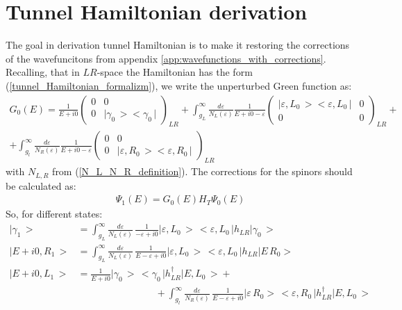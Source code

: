 \chapter{Tunnel Hamiltonian derivation} 
\label{app:tunnel}
The goal in derivation tunnel Hamiltonian is to make it restoring the corrections of the wavefuncitons from appendix \ref{app:wavefunctions_with_corrections}.
Recalling, that in $ LR $-space the Hamiltonian has the form (\ref{tunnel_Hamiltonian_formalizm}), we write the unperturbed Green function as:
\begin{multline}
G_{0}\left(E\right)=\frac{1}{E+i0}\begin{pmatrix}0 & 0\\
0 & \big|\gamma_{0}\,\big>\big<\gamma_{0}\,\big|
\end{pmatrix}_{LR}+\int_{g_{L}}^{\infty}\frac{d\varepsilon}{N_{L}\left(\varepsilon\right)}\frac{1}{E+i0-\varepsilon}\begin{pmatrix}\big|\varepsilon,L_{0}\,\big>\big<\varepsilon,L_{0}\,\big| & 0\\
0 & 0
\end{pmatrix}_{LR}+\\+\int_{g_{l}}^{\infty}\frac{d\varepsilon}{N_{R}\left(\varepsilon\right)}\frac{1}{E+i0-\varepsilon}\begin{pmatrix}0 & 0\\
0 & \big|\varepsilon,R_{0}\,\big>\big<\varepsilon,R_{0}\,\big|
\end{pmatrix}_{LR}
\end{multline}
with $ N_{L,R} $ from (\ref{N_L_N_R_definition}). 
The corrections for the spinors should be calculated as:
\begin{gather}
\Psi_{1}\left(E\right)=G_{0}\left(E\right)H_{T}\Psi_{0}\left(E\right)
\end{gather}
So, for different states:
\begin{align}
\big|\gamma_{1}\,\big>&=\int_{g_{L}}^{\infty}\frac{d\varepsilon}{N_{L}\left(\varepsilon\right)}\,\frac{1}{-\varepsilon+i0}\big|\varepsilon,L_{0}\,\big>\,\big<\varepsilon,L_{0}\,\big|h_{LR}\big|\gamma_{0}\,\big>
\\
\big|E+i0,R_{1}\,\big>&=\int_{g_{L}}^{\infty}\frac{d\varepsilon}{N_{L}\left(\varepsilon\right)}\,\frac{1}{E-\varepsilon+i0}\big|\varepsilon,L_{0}\,\big>\,\big<\varepsilon,L_{0}\,\big|h_{LR}\big|E\,R_{0}\big>
\\
\nonumber
\big|E+i0,L_{1}\,\big>&=\frac{1}{E+i0}\big|\gamma_{0}\,\big>\,\big<\gamma_{0}\,\big|h_{LR}^{\dagger}\big|E,L_{0}\,\big>+
\\	
&\qquad\qquad\qquad\qquad
+\int_{g_{l}}^{\infty}\frac{d\varepsilon}{N_{R}\left(\varepsilon\right)}\,\frac{1}{E-\varepsilon+i0}\big|\varepsilon\,R_{0}\big>\,\big<\varepsilon,R_{0}\,\big|h_{LR}^{\dagger}\big|E,L_{0}\,\big>
\end{align}

